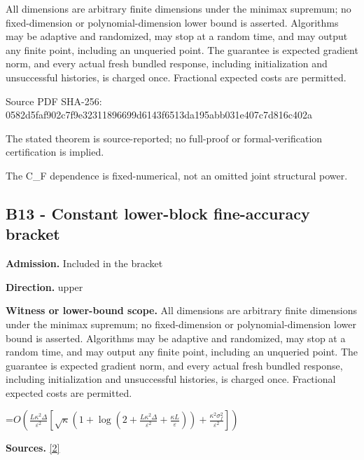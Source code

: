 \documentclass[10pt,a4paper]{article}
\newcommand{\AtlasMath}[1]{\par\begingroup\centering\setbox0=\hbox{$\displaystyle #1$}\ifdim\wd0>1.4\linewidth\typeout{ATLAS WIDE FORMULA: \the\wd0}\fi\ifdim\wd0>\linewidth\resizebox{\linewidth}{!}{\box0}\else\box0\fi\par\endgroup}
\begin{document}
All dimensions are arbitrary finite dimensions under the minimax supremum; no fixed-dimension or polynomial-dimension lower bound is asserted. Algorithms may be adaptive and randomized, may stop at a random time, and may output any finite point, including an unqueried point. The guarantee is expected gradient norm, and every actual fresh bundled response, including initialization and unsuccessful histories, is charged once. Fractional expected costs are permitted.



Source PDF SHA-256: 0582d5faf902c7f9e3231189\allowbreak{}6699d6143f6513da195abb03\allowbreak{}1e407c7d816c402a



The stated theorem is source-reported; no full-proof or formal-verification certification is implied.



The C\_F dependence is fixed-numerical, not an omitted joint structural power.



\subsection{B13 - Constant lower-block fine-accuracy bracket}


\textbf{Admission.} Included in the bracket



\textbf{Direction.} upper



\textbf{Witness or lower-bound scope.} All dimensions are arbitrary finite dimensions under the minimax supremum; no fixed-dimension or polynomial-dimension lower bound is asserted. Algorithms may be adaptive and randomized, may stop at a random time, and may output any finite point, including an unqueried point. The guarantee is expected gradient norm, and every actual fresh bundled response, including initialization and unsuccessful histories, is charged once. Fractional expected costs are permitted.



\AtlasMath{O\!\left(\frac{L\kappa^2\Delta}{\varepsilon^2}\left[\sqrt\kappa\left(1+\log\left(2+\frac{L\kappa^2\Delta}{\varepsilon^2}+\frac{\kappa L}{\varepsilon}\right)\right)+\frac{\kappa^2\sigma_f^2}{\varepsilon^2}\right]\right)}


\textbf{Sources.} \href{https://github.com/WU-Wendao/Colombo/blob/main/colombo_sensorium/Complexity_altas/data/sources/colombo/SFO_JOINT_20261126/manuscript.pdf}{[2]}
\end{document}
